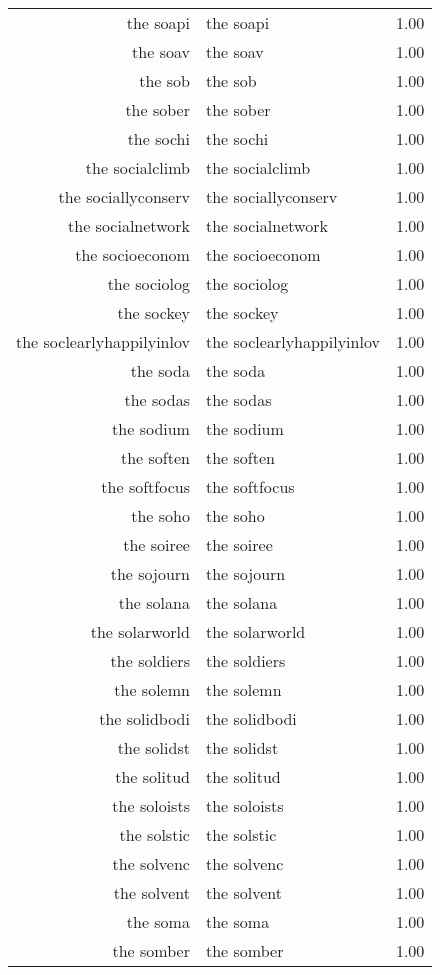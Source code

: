 \begin{table}[ht]
\begin{tabular}{rlr}
  the soapi & the soapi & 1.00 \\ 
  the soav & the soav & 1.00 \\ 
  the sob & the sob & 1.00 \\ 
  the sober & the sober & 1.00 \\ 
  the sochi & the sochi & 1.00 \\ 
  the socialclimb & the socialclimb & 1.00 \\ 
  the sociallyconserv & the sociallyconserv & 1.00 \\ 
  the socialnetwork & the socialnetwork & 1.00 \\ 
  the socioeconom & the socioeconom & 1.00 \\ 
  the sociolog & the sociolog & 1.00 \\ 
  the sockey & the sockey & 1.00 \\ 
  the soclearlyhappilyinlov & the soclearlyhappilyinlov & 1.00 \\ 
  the soda & the soda & 1.00 \\ 
  the sodas & the sodas & 1.00 \\ 
  the sodium & the sodium & 1.00 \\ 
  the soften & the soften & 1.00 \\ 
  the softfocus & the softfocus & 1.00 \\ 
  the soho & the soho & 1.00 \\ 
  the soiree & the soiree & 1.00 \\ 
  the sojourn & the sojourn & 1.00 \\ 
  the solana & the solana & 1.00 \\ 
  the solarworld & the solarworld & 1.00 \\ 
  the soldiers & the soldiers & 1.00 \\ 
  the solemn & the solemn & 1.00 \\ 
  the solidbodi & the solidbodi & 1.00 \\ 
  the solidst & the solidst & 1.00 \\ 
  the solitud & the solitud & 1.00 \\ 
  the soloists & the soloists & 1.00 \\ 
  the solstic & the solstic & 1.00 \\ 
  the solvenc & the solvenc & 1.00 \\ 
  the solvent & the solvent & 1.00 \\ 
  the soma & the soma & 1.00 \\ 
  the somber & the somber & 1.00 \\ 

\end{tabular}
\end{table}

